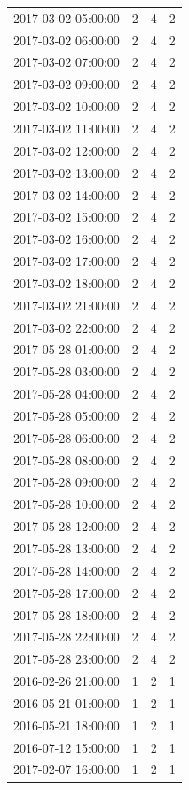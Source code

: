 \begin{tabular}{lrrr}
2017-03-02 05:00:00 & 2 & 4 & 2 \\
2017-03-02 06:00:00 & 2 & 4 & 2 \\
2017-03-02 07:00:00 & 2 & 4 & 2 \\
2017-03-02 09:00:00 & 2 & 4 & 2 \\
2017-03-02 10:00:00 & 2 & 4 & 2 \\
2017-03-02 11:00:00 & 2 & 4 & 2 \\
2017-03-02 12:00:00 & 2 & 4 & 2 \\
2017-03-02 13:00:00 & 2 & 4 & 2 \\
2017-03-02 14:00:00 & 2 & 4 & 2 \\
2017-03-02 15:00:00 & 2 & 4 & 2 \\
2017-03-02 16:00:00 & 2 & 4 & 2 \\
2017-03-02 17:00:00 & 2 & 4 & 2 \\
2017-03-02 18:00:00 & 2 & 4 & 2 \\
2017-03-02 21:00:00 & 2 & 4 & 2 \\
2017-03-02 22:00:00 & 2 & 4 & 2 \\
2017-05-28 01:00:00 & 2 & 4 & 2 \\
2017-05-28 03:00:00 & 2 & 4 & 2 \\
2017-05-28 04:00:00 & 2 & 4 & 2 \\
2017-05-28 05:00:00 & 2 & 4 & 2 \\
2017-05-28 06:00:00 & 2 & 4 & 2 \\
2017-05-28 08:00:00 & 2 & 4 & 2 \\
2017-05-28 09:00:00 & 2 & 4 & 2 \\
2017-05-28 10:00:00 & 2 & 4 & 2 \\
2017-05-28 12:00:00 & 2 & 4 & 2 \\
2017-05-28 13:00:00 & 2 & 4 & 2 \\
2017-05-28 14:00:00 & 2 & 4 & 2 \\
2017-05-28 17:00:00 & 2 & 4 & 2 \\
2017-05-28 18:00:00 & 2 & 4 & 2 \\
2017-05-28 22:00:00 & 2 & 4 & 2 \\
2017-05-28 23:00:00 & 2 & 4 & 2 \\
2016-02-26 21:00:00 & 1 & 2 & 1 \\
2016-05-21 01:00:00 & 1 & 2 & 1 \\
2016-05-21 18:00:00 & 1 & 2 & 1 \\
2016-07-12 15:00:00 & 1 & 2 & 1 \\
2017-02-07 16:00:00 & 1 & 2 & 1 \\

\end{tabular}
